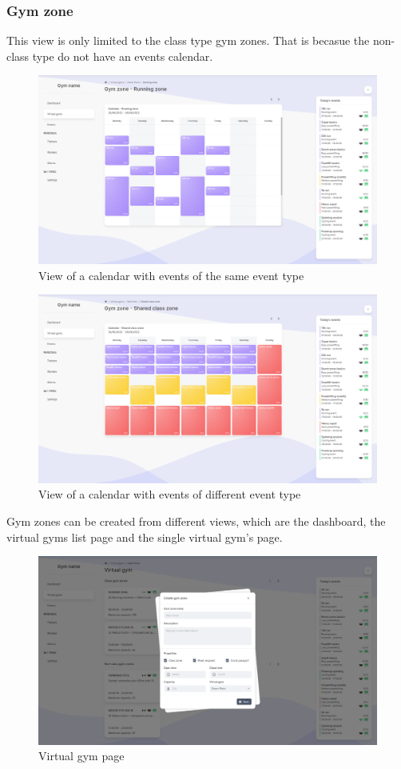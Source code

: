 \documentclass[a4paper, 12pt, oneside]{book}
\begin{document}
\subsubsection{Gym zone}
This view is only limited to the class type gym zones. That is becasue the non-class type do not have an events calendar.
\begin{figure}[H]
	\centering
	\includegraphics[width=\textwidth]{assets/core-screenshots/gym-zone-one.png}
	\caption{View of a calendar with events of the same event type}
\end{figure}
\begin{figure}[H]
	\centering
	\includegraphics[width=\textwidth]{assets/core-screenshots/gym-zone-two.png}
	\caption{View of a calendar with events of different event type}
\end{figure}
Gym zones can be created from different views, which are the dashboard, the virtual gyms list page and the single virtual gym's page.
\begin{figure}[H]
	\centering
	\includegraphics[width=\textwidth]{assets/core-screenshots/create-gym-zone.png}
	\caption{Virtual gym page}
\end{figure}
\end{document}
